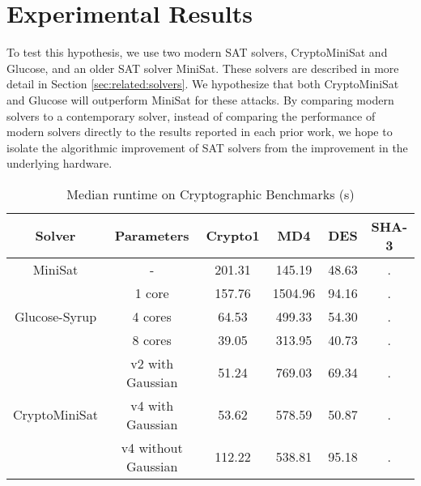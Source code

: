 \section{Experimental Results}
\label{sec:results}


To test this hypothesis, we use two modern SAT solvers, CryptoMiniSat and Glucose, and an older SAT solver MiniSat. These solvers are described in more detail in Section \ref{sec:related:solvers}. 
We hypothesize that both CryptoMiniSat and Glucose will outperform MiniSat for these attacks. By comparing modern solvers to a contemporary solver, instead of comparing the performance of modern solvers directly to the results reported in each prior work, we hope to isolate the algorithmic improvement of SAT solvers from the improvement in the underlying hardware.


\begin{table}[!htbp]
	\centering
	\begin{tabular}{|c|c|c|c|c|c|}
		\hline
		\textbf{Solver} & \textbf{Parameters} & \textbf{Crypto1} & \textbf{MD4} & \textbf{DES} & \textbf{SHA-3} \\
		\hline
		MiniSat & - & 201.31 & 145.19 & 48.63 & .\\
		\hline
		\multirow{3}{*}{Glucose-Syrup} & 1 core & 157.76 & 1504.96 & 94.16 & .\\ \cline{2-6}
		& 4 cores & 64.53 & 499.33 & 54.30 & .\\ \cline{2-6}
		& 8 cores & 39.05 & 313.95 & 40.73 & .\\
		\hline
		
		\multirow{3}{*}{CryptoMiniSat} & v2 with Gaussian & 51.24 & 769.03 & 69.34 & . \\ \cline{2-6}
		& v4 with Gaussian & 53.62 & 578.59 & 50.87 & . \\ \cline{2-6}
		& v4 without Gaussian & 112.22 & 538.81 & 95.18 & .\\
		\hline
	\end{tabular}
	
	\caption{Median runtime on Cryptographic Benchmarks (s)}
	\label{table:crypto1:runtime}
\end{table}